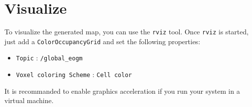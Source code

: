 \section{Visualize}

To visualize the generated map, you can use the \texttt{rviz} tool. Once \texttt{rviz} is started, just add a \texttt{ColorOccupancyGrid} and set the following properties:

\begin{itemize}
    \item \texttt{Topic} : \texttt{/global\_eogm}
    \item \texttt{Voxel coloring Scheme} : \texttt{Cell color}
\end{itemize}

It is recommanded to enable graphics acceleration if you run your system in a virtual machine.